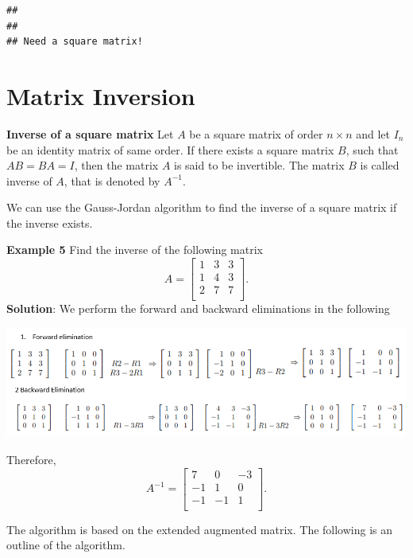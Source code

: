 \documentclass[
]{book}
\begin{document}
\begin{verbatim}
## 
## 
## Need a square matrix!
\end{verbatim}

\hfill\break

\hypertarget{matrix-inversion}{%
\section{Matrix Inversion}\label{matrix-inversion}}

\textbf{Inverse of a square matrix} Let \(A\) be a square matrix of order \(n \times n\) and let \(I_n\) be an identity matrix of same order. If there exists a square matrix \(B\), such that \(AB = BA = I\), then the matrix \(A\) is said to be invertible. The matrix \(B\) is called inverse of \(A\), that is denoted by \(A^{-1}\).

We can use the Gauss-Jordan algorithm to find the inverse of a square matrix if the inverse exists.

\textbf{Example 5} Find the inverse of the following matrix
\[
A = \left[\begin{array}{cccc} 
1 & 3 & 3    \\ 
1 & 4 & 3  \\ 
2 & 7 & 7  \\
\end{array}
\right].
\]
\textbf{Solution}: We perform the forward and backward eliminations in the following

\begin{center}\includegraphics[width=0.99\linewidth]{img08/w08-matrixInversion} \end{center}

Therefore,
\[
A^{-1} = \left[\begin{array}{cccc} 
7 & 0 & -3    \\ 
-1 & 1 & 0  \\ 
-1 & -1 & 1  \\
\end{array}
\right].
\]

The algorithm is based on the extended augmented matrix. The following is an outline of the algorithm.
\end{document}
